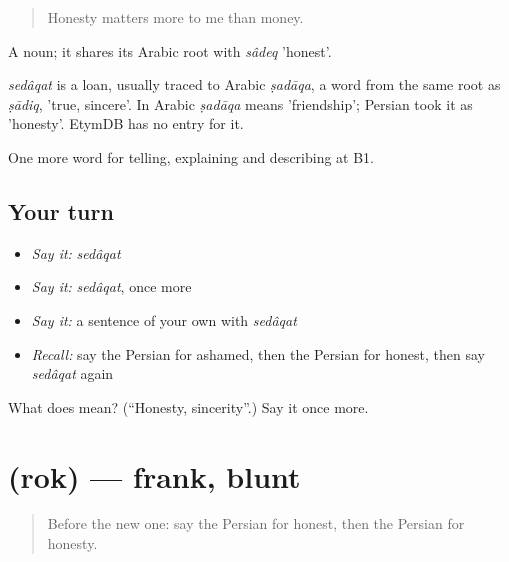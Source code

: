 \begin{quote}
Honesty matters more to me than money.
\end{quote}

A noun; it shares its Arabic root with \emph{sâdeq} 'honest'.

\begin{cousinweb}
\emph{sedâqat} is a loan, usually traced to Arabic \emph{ṣadāqa}, a word from the same root as \emph{ṣādiq}, 'true, sincere'. In Arabic \emph{ṣadāqa} means 'friendship'; Persian took it as 'honesty'. EtymDB has no entry for it.
\end{cousinweb}

\begin{grammarlens}[title={What you've built}]
One more word for telling, explaining and describing at B1.
\end{grammarlens}

\subsection*{Your turn}
\begin{itemize}
\raggedright
  \item \emph{Say it:} \emph{sedâqat}
  \item \emph{Say it:} \emph{sedâqat}, once more
  \item \emph{Say it:} a sentence of your own with \emph{sedâqat}
  \item \emph{Recall:} say the Persian for ashamed, then the Persian for honest, then say \emph{sedâqat} again
\end{itemize}

\begin{tcolorbox}[breakable,colback=teal!4,colframe=teal!35!black,title={Before you move on}]
What does  mean? (\textquotedblleft{}Honesty, sincerity\textquotedblright{}.) Say it once more.
\end{tcolorbox}
\section[\texorpdfstring{\fa{رک} (rok)}{رک (rok)}]{ (rok) — frank, blunt}

\label{lesson:FA-C483-rok}



\begin{quote}
Before the new one: say the Persian for honest, then the Persian for honesty.
\end{quote}

